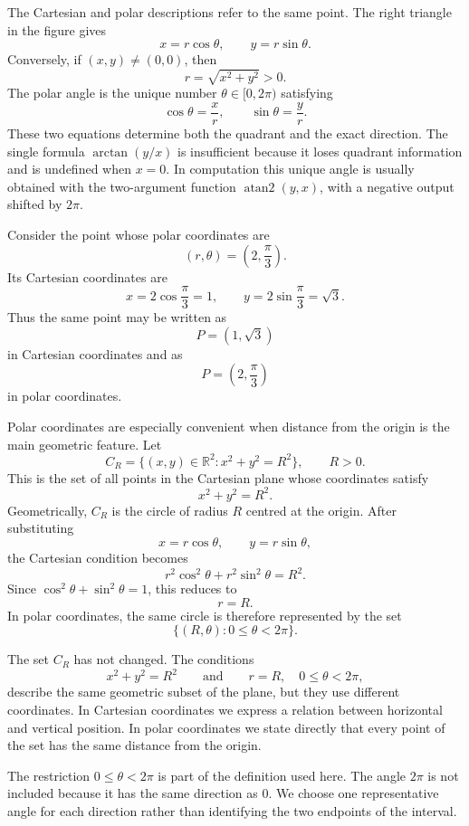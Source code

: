 The Cartesian and polar descriptions refer to the same point. The right triangle
in the figure gives
\[
x=r\cos\theta,
\qquad
y=r\sin\theta.
\]
Conversely, if $(x,y)\neq(0,0)$, then
\[
r=\sqrt{x^2+y^2}>0.
\]
The polar angle is the unique number $\theta\in[0,2\pi)$ satisfying
\[
\boxed{
\cos\theta=\frac{x}{r},
\qquad
\sin\theta=\frac{y}{r}
}.
\]
These two equations determine both the quadrant and the exact direction. The
single formula $\arctan(y/x)$ is insufficient because it loses quadrant
information and is undefined when $x=0$. In computation this unique angle is
usually obtained with the two-argument function $\operatorname{atan2}(y,x)$,
with a negative output shifted by $2\pi$.

\begin{examplebox}
Consider the point whose polar coordinates are
\[
(r,\theta)=\left(2,\frac{\pi}{3}\right).
\]
Its Cartesian coordinates are
\[
x=2\cos\frac{\pi}{3}=1,
\qquad
y=2\sin\frac{\pi}{3}=\sqrt{3}.
\]
Thus the same point may be written as
\[
P=\left(1,\sqrt{3}\right)
\]
in Cartesian coordinates and as
\[
P=\left(2,\frac{\pi}{3}\right)
\]
in polar coordinates.
\end{examplebox}

Polar coordinates are especially convenient when distance from the origin is the
main geometric feature. Let
\[
C_R
=
\{(x,y)\in\mathbb{R}^2:x^2+y^2=R^2\},
\qquad R>0.
\]
This is the set of all points in the Cartesian plane whose coordinates satisfy
\[
x^2+y^2=R^2.
\]
Geometrically, $C_R$ is the circle of radius $R$ centred at the origin. After
substituting
\[
x=r\cos\theta,
\qquad
y=r\sin\theta,
\]
the Cartesian condition becomes
\[
r^2\cos^2\theta+r^2\sin^2\theta=R^2.
\]
Since $\cos^2\theta+\sin^2\theta=1$, this reduces to
\[
\boxed{r=R}.
\]
In polar coordinates, the same circle is therefore represented by the set
\[
\{(R,\theta):0\leq\theta<2\pi\}.
\]

The set $C_R$ has not changed. The conditions
\[
x^2+y^2=R^2
\qquad\text{and}\qquad
r=R,
\quad 0\leq\theta<2\pi,
\]
describe the same geometric subset of the plane, but they use different
coordinates. In Cartesian coordinates we express a relation between horizontal
and vertical position. In polar coordinates we state directly that every point
of the set has the same distance from the origin.

\begin{center}
\end{center}

\begin{remarkbox}
The restriction $0\leq\theta<2\pi$ is part of the definition used here. The
angle $2\pi$ is not included because it has the same direction as $0$. We choose
one representative angle for each direction rather than identifying the two
endpoints of the interval.
\end{remarkbox}